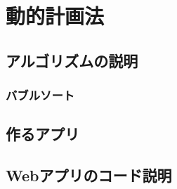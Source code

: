 \chapter{動的計画法}
\label{chap:chap05-dp}

\section{アルゴリズムの説明}
\label{sec:5-1}

\subsection*{バブルソート}
\label{sec:5-1-1}

\section{作るアプリ}
\label{sec:5-2}

\section{Webアプリのコード説明}
\label{sec:5-3}
